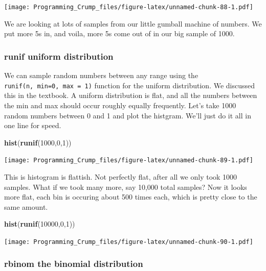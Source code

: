 \documentclass[]{book}
\newenvironment{Shaded}{\begin{snugshade}}{\end{snugshade}}
\newcommand{\KeywordTok}[1]{\textcolor[rgb]{0.13,0.29,0.53}{\textbf{{#1}}}}
\newcommand{\DecValTok}[1]{\textcolor[rgb]{0.00,0.00,0.81}{{#1}}}
\newcommand{\NormalTok}[1]{{#1}}
\theoremstyle{definition}
\theoremstyle{definition}
\theoremstyle{definition}
\theoremstyle{remark}
\begin{document}
\texttt{[image: Programming\_Crump\_files/figure-latex/unnamed-chunk-88-1.pdf]}

We are looking at lots of samples from our little gumball machine of
numbers. We put more 5s in, and voila, more 5s come out of in our big
sample of 1000.

\subsubsection{runif uniform
distribution}\label{runif-uniform-distribution}

We can sample random numbers between any range using the
\texttt{runif(n,\ min=0,\ max\ =\ 1)} function for the uniform
distribution. We discussed this in the textbook. A uniform distribution
is flat, and all the numbers between the min and max should occur
roughly equally frequently. Let's take 1000 random numbers between 0 and
1 and plot the histgram. We'll just do it all in one line for speed.

\begin{Shaded}
\begin{Highlighting}[]
\KeywordTok{hist}\NormalTok{(}\KeywordTok{runif}\NormalTok{(}\DecValTok{1000}\NormalTok{,}\DecValTok{0}\NormalTok{,}\DecValTok{1}\NormalTok{))}
\end{Highlighting}
\end{Shaded}

\texttt{[image: Programming\_Crump\_files/figure-latex/unnamed-chunk-89-1.pdf]}

This is histogram is flattish. Not perfectly flat, after all we only
took 1000 samples. What if we took many more, say 10,000 total samples?
Now it looks more flat, each bin is occuring about 500 times each, which
is pretty close to the same amount.

\begin{Shaded}
\begin{Highlighting}[]
\KeywordTok{hist}\NormalTok{(}\KeywordTok{runif}\NormalTok{(}\DecValTok{10000}\NormalTok{,}\DecValTok{0}\NormalTok{,}\DecValTok{1}\NormalTok{))}
\end{Highlighting}
\end{Shaded}

\texttt{[image: Programming\_Crump\_files/figure-latex/unnamed-chunk-90-1.pdf]}

\subsubsection{rbinom the binomial
distribution}\label{rbinom-the-binomial-distribution}
\end{document}
